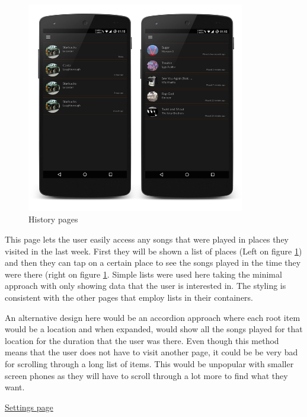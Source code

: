 \noindent
\begin{figure}[h!]
\centering
\includegraphics[width=0.85\textwidth]{./img/historyboth.png}
\caption{History pages}
\label{fig:historyboth}
\end{figure}

This page lets the user easily access any songs that were played in places they visited in the last week. First they will be shown a list of places (Left on figure \ref{fig:historyboth}) and then they can tap on a certain place to see the songs played in the time they were there (right on figure \ref{fig:historyboth}. Simple lists were used here taking the minimal approach with only showing data that the user is interested in. The styling is consistent with the other pages that employ lists in their containers.

An alternative design here would be an accordion approach where each root item would be a location and when expanded, would show all the songs played for that location for the duration that the user was there. Even though this method means that the user does not have to visit another page, it could be be very bad for scrolling through a long list of items. This would be unpopular with smaller screen phones as they will have to scroll through a lot more to find what they want.

\clearpage

\noindent\underline{Settings page}\newline

